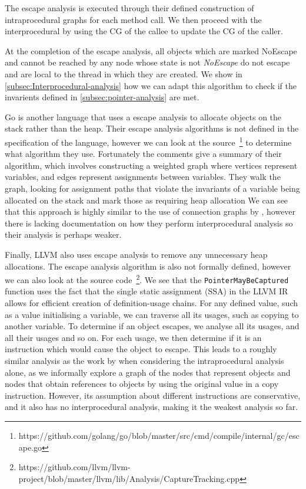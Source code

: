 \documentclass{proposal}
\begin{document}
    The escape analysis is executed through their defined construction of intraprocedural graphs for each method call.
    We then proceed with the interprocedural by using the CG of the callee to update the CG of the caller.

    At the completion of the escape analysis, all objects which are marked NoEscape and cannot be reached by any node whose state is not \emph{NoEscape} do not escape and are local to the thread in which they are created.
    We show in \autoref{subsec:Interprocedural-analysis} how we can adapt this algorithm to check if the invarients defined in \autoref{subsec:pointer-analysis} are met.


    Go is another language that uses a escape analysis to allocate objects on the stack rather than the heap.
    Their escape analysis algorithms is not defined in the specification of the language, however we can look at the source~\footnote{https://github.com/golang/go/blob/master/src/cmd/compile/internal/gc/escape.go} to determine what algorithm they use.
    Fortunately the comments give a summary of their algorithm, which involves constructing a weighted graph where vertices represent variables, and edges represent assignments between variables.
    They walk the graph, looking for assignment paths that violate the invariants of a variable being allocated on the stack and mark those as requiring heap allocation
    We can see that this approach is highly similar to the use of connection graphs by \citet{Choi1999}, however there is lacking documentation on how they perform interprocedural analysis so their analysis is perhaps weaker.

    Finally, LLVM also uses escape analysis to remove any unnecessary heap allocations.
    The escape analysis algorithm is also not formally defined, however we can also look at the source code~\footnote{https://github.com/llvm/llvm-project/blob/master/llvm/lib/Analysis/CaptureTracking.cpp}.
    We see that the \texttt{PointerMayBeCaptured} function uses the fact that the single static assignment (SSA) in the LLVM IR allows for efficient creation of definition-usage chains.
    For any defined value, such as a value initialising a variable, we can traverse all its usages, such as copying to another variable.
    To determine if an object escapes, we analyse all its usages, and all their usages and so on.
    For each usage, we then determine if it is an instruction which would cause the object to escape.
    This leads to a roughly similar analysis as the work by \citet{Choi1999} when considering the intraprocedural analysis alone, as we informally explore a graph of the nodes that represent objects and nodes that obtain references to objects by using the original value in a copy instruction.
    However, its assumption about different instructions are conservative, and it also has no interprocedural analysis, making it the weakest analysis so far.
\end{document}
